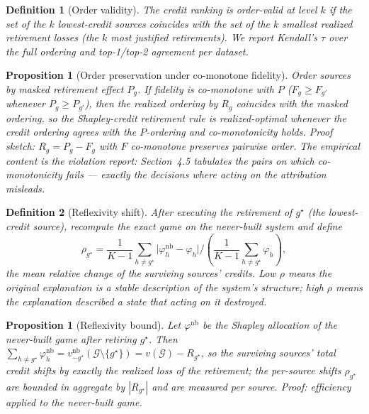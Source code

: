 \documentclass[pdflatex,sn-mathphys-num]{sn-jnl}
\theoremstyle{thmstyleone}%
\newtheorem{proposition}[theorem]{Proposition}%
\theoremstyle{thmstyletwo}%
\theoremstyle{thmstylethree}%
\newtheorem{definition}{Definition}%
\newcommand{\Gset}{\mathcal{G}}
\newcommand{\reg}{R}
\newcommand{\pred}{P}
\begin{document}
\begin{definition}[Order validity]\label{def2}
The credit ranking is order-valid at level $k$ if the set of the $k$ lowest-credit sources coincides with the set of the $k$ smallest realized retirement losses (the $k$ most justified retirements). We report Kendall's $\tau$ over the full ordering and top-1/top-2 agreement per dataset.
\end{definition}

\begin{proposition}[Order preservation under co-monotone fidelity]\label{prop2}
Order sources by masked retirement effect $\pred_g$. If fidelity is co-monotone with $\pred$ ($F_g \ge F_{g'}$ whenever $\pred_g \ge \pred_{g'}$), then the realized ordering by $\reg_g$ coincides with the masked ordering, so the Shapley-credit retirement rule is realized-optimal whenever the credit ordering agrees with the $\pred$-ordering and co-monotonicity holds. \emph{Proof sketch: $\reg_g = \pred_g - F_g$ with $F$ co-monotone preserves pairwise order.} The empirical content is the violation report: Section~4.5 tabulates the pairs on which co-monotonicity fails --- exactly the decisions where acting on the attribution misleads.
\end{proposition}

\begin{definition}[Reflexivity shift]\label{def3}
After executing the retirement of $g^\star$ (the lowest-credit source), recompute the exact game on the never-built system and define
\[
\rho_{g^\star} = \frac{1}{K-1}\sum_{h\neq g^\star} \bigl|\varphi_h^{\mathrm{nb}} - \varphi_h\bigr| \Big/ \left(\frac{1}{K-1}\sum_{h\neq g^\star}\varphi_h\right),
\]
the mean relative change of the surviving sources' credits. Low $\rho$ means the original explanation is a stable description of the system's structure; high $\rho$ means the explanation described a state that acting on it destroyed.
\end{definition}

\begin{proposition}[Reflexivity bound]\label{prop3}
Let $\varphi^{\mathrm{nb}}$ be the Shapley allocation of the never-built game after retiring $g^\star$. Then $\sum_{h\neq g^\star}\varphi_h^{\mathrm{nb}} = v^{\mathrm{nb}}_{-g^\star}(\Gset\setminus\{g^\star\}) = v(\Gset) - \reg_{g^\star}$, so the surviving sources' total credit shifts by exactly the realized loss of the retirement; the per-source shifts $\rho_{g^\star}$ are bounded in aggregate by $|\reg_{g^\star}|$ and are measured per source. \emph{Proof: efficiency applied to the never-built game.}
\end{proposition}
\end{document}
